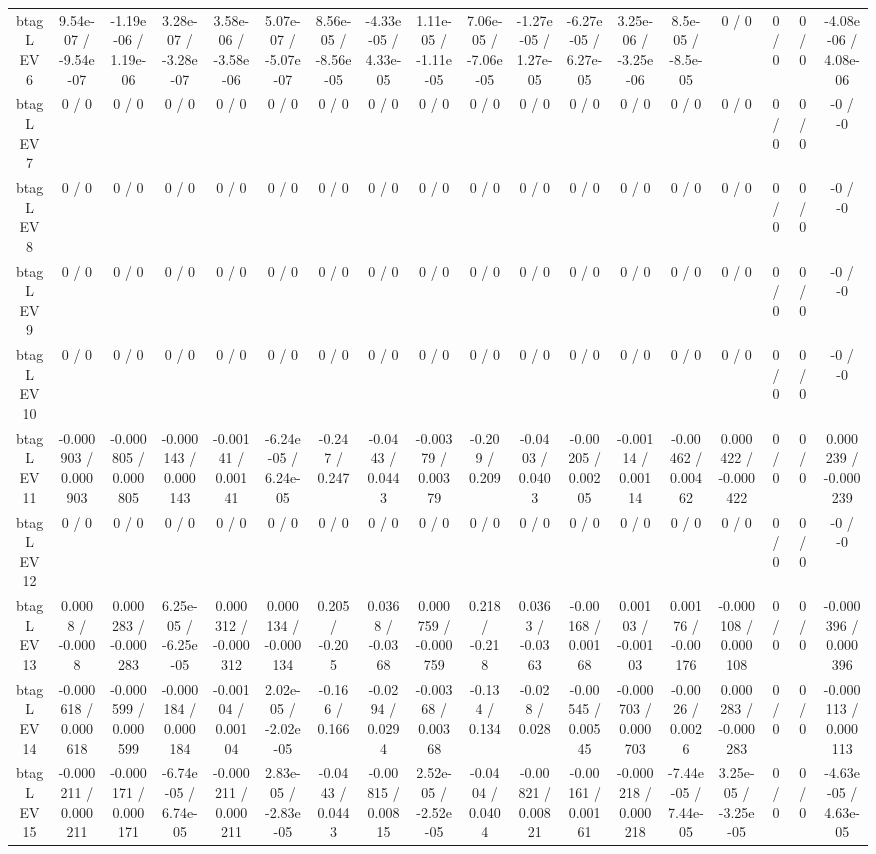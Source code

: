 \documentclass[10pt]{article}
\begin{document}
\begin{table}[htbp]
\begin{center}
\begin{tabular}{|c|c|c|c|c|c|c|c|c|c|c|c|c|c|c|c|c|c|}
  btag L EV 6 & 9.54e-07 / -9.54e-07 & -1.19e-06 / 1.19e-06 & 3.28e-07 / -3.28e-07 & 3.58e-06 / -3.58e-06 & 5.07e-07 / -5.07e-07 & 8.56e-05 / -8.56e-05 & -4.33e-05 / 4.33e-05 & 1.11e-05 / -1.11e-05 & 7.06e-05 / -7.06e-05 & -1.27e-05 / 1.27e-05 & -6.27e-05 / 6.27e-05 & 3.25e-06 / -3.25e-06 & 8.5e-05 / -8.5e-05 & 0 / 0 & 0 / 0 & 0 / 0 & -4.08e-06 / 4.08e-06 \\ 
  btag L EV 7 & 0 / 0 & 0 / 0 & 0 / 0 & 0 / 0 & 0 / 0 & 0 / 0 & 0 / 0 & 0 / 0 & 0 / 0 & 0 / 0 & 0 / 0 & 0 / 0 & 0 / 0 & 0 / 0 & 0 / 0 & 0 / 0 & -0 / -0 \\ 
  btag L EV 8 & 0 / 0 & 0 / 0 & 0 / 0 & 0 / 0 & 0 / 0 & 0 / 0 & 0 / 0 & 0 / 0 & 0 / 0 & 0 / 0 & 0 / 0 & 0 / 0 & 0 / 0 & 0 / 0 & 0 / 0 & 0 / 0 & -0 / -0 \\ 
  btag L EV 9 & 0 / 0 & 0 / 0 & 0 / 0 & 0 / 0 & 0 / 0 & 0 / 0 & 0 / 0 & 0 / 0 & 0 / 0 & 0 / 0 & 0 / 0 & 0 / 0 & 0 / 0 & 0 / 0 & 0 / 0 & 0 / 0 & -0 / -0 \\ 
  btag L EV 10 & 0 / 0 & 0 / 0 & 0 / 0 & 0 / 0 & 0 / 0 & 0 / 0 & 0 / 0 & 0 / 0 & 0 / 0 & 0 / 0 & 0 / 0 & 0 / 0 & 0 / 0 & 0 / 0 & 0 / 0 & 0 / 0 & -0 / -0 \\ 
  btag L EV 11 & -0.000903 / 0.000903 & -0.000805 / 0.000805 & -0.000143 / 0.000143 & -0.00141 / 0.00141 & -6.24e-05 / 6.24e-05 & -0.247 / 0.247 & -0.0443 / 0.0443 & -0.00379 / 0.00379 & -0.209 / 0.209 & -0.0403 / 0.0403 & -0.00205 / 0.00205 & -0.00114 / 0.00114 & -0.00462 / 0.00462 & 0.000422 / -0.000422 & 0 / 0 & 0 / 0 & 0.000239 / -0.000239 \\ 
  btag L EV 12 & 0 / 0 & 0 / 0 & 0 / 0 & 0 / 0 & 0 / 0 & 0 / 0 & 0 / 0 & 0 / 0 & 0 / 0 & 0 / 0 & 0 / 0 & 0 / 0 & 0 / 0 & 0 / 0 & 0 / 0 & 0 / 0 & -0 / -0 \\ 
  btag L EV 13 & 0.0008 / -0.0008 & 0.000283 / -0.000283 & 6.25e-05 / -6.25e-05 & 0.000312 / -0.000312 & 0.000134 / -0.000134 & 0.205 / -0.205 & 0.0368 / -0.0368 & 0.000759 / -0.000759 & 0.218 / -0.218 & 0.0363 / -0.0363 & -0.00168 / 0.00168 & 0.00103 / -0.00103 & 0.00176 / -0.00176 & -0.000108 / 0.000108 & 0 / 0 & 0 / 0 & -0.000396 / 0.000396 \\ 
  btag L EV 14 & -0.000618 / 0.000618 & -0.000599 / 0.000599 & -0.000184 / 0.000184 & -0.00104 / 0.00104 & 2.02e-05 / -2.02e-05 & -0.166 / 0.166 & -0.0294 / 0.0294 & -0.00368 / 0.00368 & -0.134 / 0.134 & -0.028 / 0.028 & -0.00545 / 0.00545 & -0.000703 / 0.000703 & -0.0026 / 0.0026 & 0.000283 / -0.000283 & 0 / 0 & 0 / 0 & -0.000113 / 0.000113 \\ 
  btag L EV 15 & -0.000211 / 0.000211 & -0.000171 / 0.000171 & -6.74e-05 / 6.74e-05 & -0.000211 / 0.000211 & 2.83e-05 / -2.83e-05 & -0.0443 / 0.0443 & -0.00815 / 0.00815 & 2.52e-05 / -2.52e-05 & -0.0404 / 0.0404 & -0.00821 / 0.00821 & -0.00161 / 0.00161 & -0.000218 / 0.000218 & -7.44e-05 / 7.44e-05 & 3.25e-05 / -3.25e-05 & 0 / 0 & 0 / 0 & -4.63e-05 / 4.63e-05 \\ 

\end{tabular}
\end{center}
\end{table}
\end{document}
